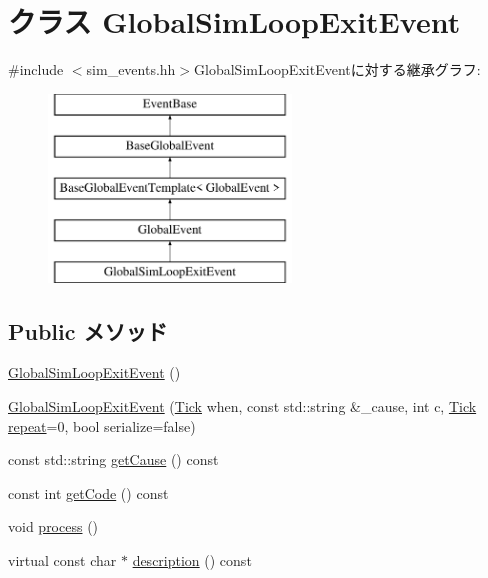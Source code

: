 \hypertarget{classGlobalSimLoopExitEvent}{
\section{クラス GlobalSimLoopExitEvent}
\label{classGlobalSimLoopExitEvent}
}


{\ttfamily \#include $<$sim\_\-events.hh$>$}GlobalSimLoopExitEventに対する継承グラフ:\begin{figure}[H]
\begin{center}
\leavevmode
\includegraphics[height=5cm]{classGlobalSimLoopExitEvent}
\end{center}
\end{figure}
\subsection*{Public メソッド}
\begin{DoxyCompactItemize}
\item 
\hyperlink{classGlobalSimLoopExitEvent_a505db8c8e70f8d5bb7773f37ad2fec75}{GlobalSimLoopExitEvent} ()
\item 
\hyperlink{classGlobalSimLoopExitEvent_a379d8b91b24d476d6acfaccada92ecac}{GlobalSimLoopExitEvent} (\hyperlink{base_2types_8hh_a5c8ed81b7d238c9083e1037ba6d61643}{Tick} when, const std::string \&\_\-cause, int c, \hyperlink{base_2types_8hh_a5c8ed81b7d238c9083e1037ba6d61643}{Tick} \hyperlink{classGlobalSimLoopExitEvent_a186e97c430ff343e8ab14129eaa8375d}{repeat}=0, bool serialize=false)
\item 
const std::string \hyperlink{classGlobalSimLoopExitEvent_adf610f0866baa489220e6d9f9e24cb4d}{getCause} () const 
\item 
const int \hyperlink{classGlobalSimLoopExitEvent_a58a2e3d87f99241c0363c9765b3ef3e9}{getCode} () const 
\item 
void \hyperlink{classGlobalSimLoopExitEvent_a2e9c5136d19b1a95fc427e0852deab5c}{process} ()
\item 
virtual const char $\ast$ \hyperlink{classGlobalSimLoopExitEvent_a5a14fe478e2393ff51f02e9b7be27e00}{description} () const 
\end{DoxyCompactItemize}
